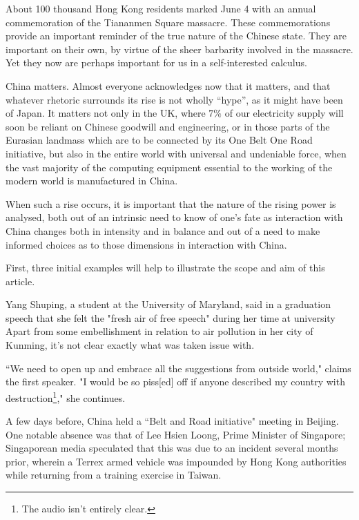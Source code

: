 \documentclass[11pt,a4paper]{report}
\newcounter{count}
\begin{document}
\begin{multicols}{2}
	
About 100 thousand Hong Kong residents marked June 4 with an annual commemoration of the Tiananmen Square massacre. These commemorations provide an important reminder of the true nature of the Chinese state. They are important on their own, by virtue of the sheer barbarity involved in the massacre. Yet they now are perhaps important for us in a self-interested calculus.

China matters. Almost everyone acknowledges now that it matters, and that whatever rhetoric surrounds its rise is not wholly ``hype'', as it might have been of Japan. It matters not only in the UK, where $7\%$ of our electricity supply will soon be reliant on Chinese goodwill and engineering, or in those parts of the Eurasian landmass which are to be connected by its One Belt One Road initiative, but also in the entire world with universal and undeniable force, when the vast majority of the computing equipment essential to the working of the modern world is manufactured in China.

When such a rise occurs, it is important that the nature of the rising power is analysed, both out of an intrinsic need to know of one's fate as interaction with China changes both in intensity and in balance and out of a need to make informed choices as to those dimensions in interaction with China.

First, three initial examples will help to illustrate the scope and aim of this article.

Yang Shuping, a student at the University of Maryland, said in a graduation speech that she felt the "fresh air of free speech" during her time at university Apart from some embellishment in relation to air pollution in her city of Kunming, it's not clear exactly what was taken issue with.

``We need to open up and embrace all the suggestions from outside world," claims the first speaker. "I would be so piss[ed] off if anyone described my country with destruction\footnote{The audio isn't entirely clear.}," she continues.

A few days before, China held a ``Belt and Road initiative" meeting in Beijing. One notable absence was that of Lee Hsien Loong, Prime Minister of Singapore; Singaporean media speculated that this was due to an incident several months prior, wherein a Terrex armed vehicle was impounded by Hong Kong authorities while returning from a training exercise in Taiwan.


\end{multicols}
\end{document}
